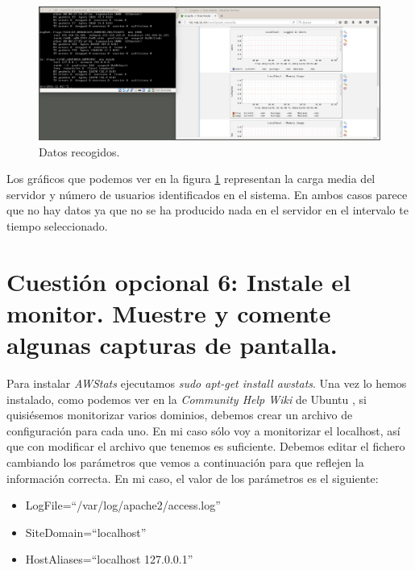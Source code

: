 \documentclass[a4paper,titlepage,12pt]{scrartcl}	%
\numberwithin{figure}{section} %
\numberwithin{table}{section} %
\begin{document}
	\begin{figure}[H]
		\includegraphics[width=\linewidth]{./Imagenes/O5-13.png}
		\vspace{-0.5cm}
		\caption[Datos recogidos.]{Datos recogidos.}
		\label{O5-13}
	\end{figure}
	
	Los gráficos que podemos ver en la figura \ref{O5-13} representan la carga media del servidor y número de usuarios identificados en el sistema. En ambos casos parece que no hay datos ya que no se ha producido nada en el servidor en el intervalo te tiempo seleccionado.
	
	\section[Cuestión opcional 6: Instale el monitor. Muestre y comente algunas capturas de pantalla.]{Cuestión opcional 6: Instale el monitor. Muestre y comente algunas capturas de pantalla.}
	
	Para instalar \textit{AWStats} ejecutamos \textit{sudo apt-get install awstats}. Una vez lo hemos instalado, como podemos ver en la \textit{Community Help Wiki} de Ubuntu \cite{awstats_instalacion}, si quisiésemos monitorizar varios dominios, debemos crear un archivo de configuración para cada uno. En mi caso sólo voy a monitorizar el localhost, así que con modificar el archivo que tenemos es suficiente. Debemos editar el fichero cambiando los parámetros que vemos a continuación para que reflejen la información correcta. En mi caso, el valor de los parámetros es el siguiente: 
	\begin{itemize}
		\item LogFile=``/var/log/apache2/access.log''
		\item SiteDomain=``localhost''
		\item HostAliases=``localhost 127.0.0.1''
	\end{itemize}
	
\end{document}
